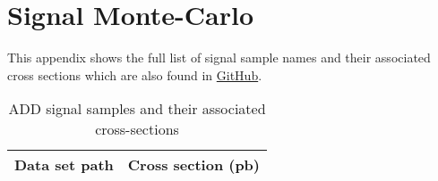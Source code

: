 \section{Signal Monte-Carlo}
\label{ch:appendix_signal_monte_carlo}

This appendix shows the full list of signal sample names and their associated cross sections which are also found in \href{https://github.com/cms-exotica-diphotons/diphoton-analysis/blob/dbd7b7b1ea7210aa55a27dcce8e84a3a5057d265/CommonClasses/interface/CrossSections.h}{GitHub}.

\begin{landscape}
\begin{table}[!htbp]
       \caption{ ADD signal samples and their associated cross-sections }
       \centering
       \vspace{\baselineskip}
       \begin{tabular}{lc}
       \hline \hline
       Data set path & Cross section (pb)\\
       \hline


\end{tabular}
\end{table}
\end{landscape}
